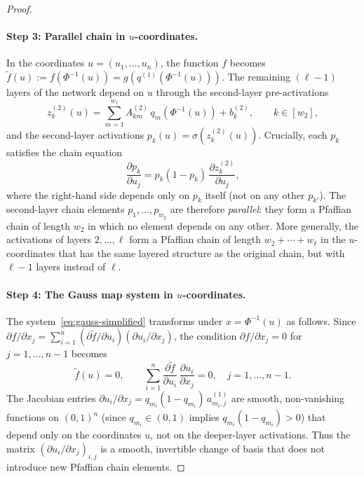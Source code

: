 \begin{proof}
\paragraph{Step 3: Parallel chain in $u$-coordinates.}
In the coordinates $u = (u_1,\ldots,u_n)$, the function $f$ becomes $\tilde{f}(u) := f(\Phi^{-1}(u)) = g(q^{(1)}(\Phi^{-1}(u)))$. The remaining $(\ell-1)$ layers of the network depend on $u$ through the second-layer pre-activations
\begin{equation*}
  z_k^{(2)}(u) = \sum_{m=1}^{w_1} A^{(2)}_{km}\, q_m(\Phi^{-1}(u)) + b_k^{(2)}, \qquad k\in [w_2],
\end{equation*}
and the second-layer activations $p_k(u) = \sigma(z_k^{(2)}(u))$. Crucially, each $p_k$ satisfies the chain equation
\begin{equation*}
  \frac{\partial p_k}{\partial u_j} = p_k(1-p_k)\,\frac{\partial z_k^{(2)}}{\partial u_j},
\end{equation*}
where the right-hand side depends only on $p_k$ itself (not on any other $p_{k'}$). The second-layer chain elements $p_1,\ldots,p_{w_2}$ are therefore \emph{parallel}: they form a Pfaffian chain of length $w_2$ in which no element depends on any other. More generally, the activations of layers $2,\ldots,\ell$ form a Pfaffian chain of length $w_2+\cdots+w_\ell$ in the $u$-coordinates that has the same layered structure as the original chain, but with $\ell-1$ layers instead of $\ell$.

\paragraph{Step 4: The Gauss map system in $u$-coordinates.}
The system~\eqref{eq:gauss-simplified} transforms under $x = \Phi^{-1}(u)$ as follows. Since $\partial f/\partial x_j = \sum_{i=1}^n (\partial \tilde{f}/\partial u_i)(\partial u_i/\partial x_j)$, the condition $\partial f/\partial x_j = 0$ for $j = 1,\ldots,n-1$ becomes
\begin{equation}\label{eq:twisted-gauss}
  \tilde{f}(u) = 0, \qquad \sum_{i=1}^n \frac{\partial \tilde{f}}{\partial u_i}\,\frac{\partial u_i}{\partial x_j} = 0, \quad j = 1,\ldots,n-1.
\end{equation}
The Jacobian entries $\partial u_i/\partial x_j = q_{m_i}(1-q_{m_i})\, a_{m_i,j}^{(1)}$ are smooth, non-vanishing functions on $(0,1)^n$ (since $q_{m_i} \in (0,1)$ implies $q_{m_i}(1-q_{m_i}) > 0$) that depend only on the coordinates $u$, not on the deeper-layer activations. Thus the matrix $(\partial u_i/\partial x_j)_{i,j}$ is a smooth, invertible change of basis that does not introduce new Pfaffian chain elements.


\end{proof}
